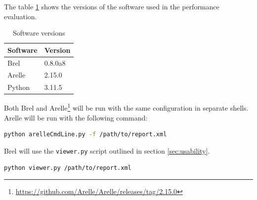 

The table \ref{tab:software-versions} shows the versions of the software used in the performance evaluation.

\begin{table}[H]
    \small
    \centering
    \begin{tabular}{|l|l|}
        \hline
        \textbf{Software} & \textbf{Version} \\
        \hline
        Brel & 0.8.0a8 \\
        Arelle & 2.15.0 \\
        Python & 3.11.5 \\
        \hline
    \end{tabular}
    \caption{Software versions}
    \label{tab:software-versions}
\end{table}

Both Brel and Arelle\footnote{\url{https://github.com/Arelle/Arelle/releases/tag/2.15.0}} will be run with the same configuration in separate shells.
Arelle will be run with the following command:

\begin{lstlisting}[language=bash, basicstyle=\ttfamily\small]
python arelleCmdLine.py -f /path/to/report.xml
\end{lstlisting}

Brel will use the \texttt{viewer.py} script outlined in section \ref{sec:usability}.

\begin{lstlisting}[language=bash, basicstyle=\ttfamily\small]
python viewer.py /path/to/report.xml
\end{lstlisting}

